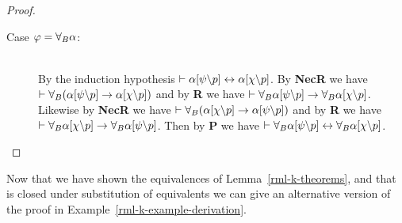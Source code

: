 \begin{proof}
\begin{description}
    \item[Case $\varphi = {\forall_{B}} \alpha$:]\hfill\\
        By the induction hypothesis $\vdash \alpha[\psi\backslash p] \leftrightarrow \alpha[\chi\backslash p]$.
        By {\bf NecR} we have $\vdash {\forall_{B}} (\alpha[\psi\backslash p] \rightarrow \alpha[\chi\backslash p])$ and by {\bf R} we have $\vdash {\forall_{B}} \alpha[\psi\backslash p] \rightarrow {\forall_{B}} \alpha[\chi\backslash p]$.
        Likewise by {\bf NecR} we have $\vdash {\forall_{B}} (\alpha[\chi\backslash p] \rightarrow \alpha[\psi\backslash p])$ and by {\bf R} we have $\vdash {\forall_{B}} \alpha[\chi\backslash p] \rightarrow {\forall_{B}} \alpha[\psi\backslash p]$.
        Then by {\bf P} we have $\vdash {\forall_{B}} \alpha[\psi\backslash p] \leftrightarrow {\forall_{B}} \alpha[\chi\backslash p]$.
\end{description}
\end{proof}

Now that we have shown the equivalences of Lemma~\ref{rml-k-theorems}, and that \axiomRmlK{} is closed under substitution of equivalents we can give an alternative version of the proof in Example~\ref{rml-k-example-derivation}.

